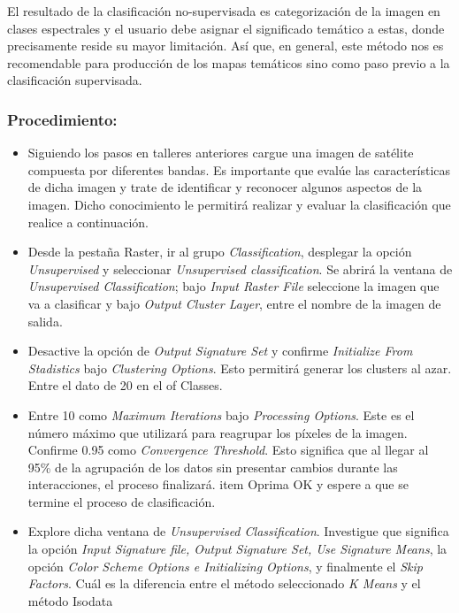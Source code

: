 \documentclass[a4paper,oneside,11pt,]{article}
\begin{document}
El resultado de la clasificación no-supervisada es categorización de la imagen en clases espectrales y el usuario debe asignar el significado temático a estas, donde precisamente reside su mayor limitación. Así que, en general, este método nos es recomendable para producción de los mapas temáticos sino como paso previo a la clasificación supervisada.

\subsubsection{Procedimiento:}
\begin{itemize}
\item Siguiendo los pasos en talleres anteriores cargue una imagen de satélite compuesta por diferentes bandas. Es importante que evalúe las características de dicha imagen y trate de identificar y reconocer algunos aspectos de la imagen. Dicho conocimiento le permitirá realizar y evaluar la clasificación que realice a continuación.
\item Desde la pestaña Raster, ir al grupo \emph{Classification}, desplegar la opción \emph{Unsupervised} y seleccionar \emph{Unsupervised classification}. Se abrirá la ventana de \emph{Unsupervised Classification}; bajo \emph{Input Raster File} seleccione la imagen que va a clasificar y bajo \emph{Output Cluster Layer},   entre el  nombre de la imagen de salida.
\item Desactive la opción de \emph{Output Signature Set} y confirme \emph{Initialize From Stadistics} bajo \emph{Clustering Options}. Esto permitirá generar los clusters al azar. Entre el dato de 20 en el of Classes.
\item Entre 10 como \emph{Maximum Iterations} bajo \emph{Processing Options}. Este es el número máximo que utilizará para reagrupar los píxeles de la imagen. Confirme 0.95 como \emph{Convergence Threshold}. Esto significa que al llegar al 95\% de la agrupación de los datos sin presentar cambios durante las interacciones, el proceso finalizará.
item Oprima OK y espere a que se termine el proceso de clasificación.
\item Explore dicha ventana de \emph{Unsupervised Classification}. Investigue que significa la opción \emph{Input Signature file, Output Signature Set, Use Signature Means}, la opción \emph{Color Scheme Options e Initializing Options}, y finalmente el \emph{Skip Factors}. Cuál es la diferencia entre el método seleccionado \emph{K Means} y el método Isodata
\end{itemize}
\end{document}
